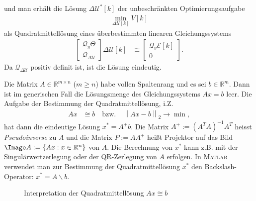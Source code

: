 und man erhält die Lösung $\Delta\mathcal{U}^{\ast}[k]$ der unbeschränkten Optimierungsaufgabe
\begin{align}
	\min\limits_{\Delta\mathcal{U}[k]}V[k]
\end{align}
als Quadratmittellösung eines überbestimmten linearen Gleichungssystems
\begin{align}
	\begin{bmatrix}
	\mathcal{Q}_y\Theta\\ \mathcal{Q}_{\Delta\mathcal{U}}
	\end{bmatrix}\Delta\mathcal{U}[k] & \cong \begin{bmatrix}
	\mathcal{Q}_y\mathcal{E}[k]\\ 0
	\end{bmatrix}. \label{eqn:kap_4_quadratmittelproblem}
\end{align}
Da $\mathcal{Q}_{\Delta\mathcal{U}}$ positiv definit ist, ist die Lösung eindeutig.
\begin{remark}
Die Matrix $A\in\mathbb{R}^{m\times n}$ ($m\ge n$) habe vollen Spaltenrang und es sei $b\in\mathbb{R}^m$. Dann ist im generischen Fall die
Lösungsmenge des Gleichungssystems $A x= b$ leer. Die Aufgabe der Bestimmung der Quadratmittellösung, i.Z.
\begin{align}
	A x & \cong b\quad \text{bzw.}\quad \left\| A x -b \right\|_2\rightarrow \min,
\end{align}
hat dann die eindeutige Lösung $x^{\ast}=A^+b$. Die Matrix $A^+:=\left(A^TA\right)^{-1}A^T$ heisst \textit{Pseudoinverse} zu $A$ und die Matrix $P:=A A^+$ heißt Projektor auf das Bild
$\Image A:=\left\{ A x : x\in\mathbb{R}^n \right\}$ von $A$. Die Berechnung von $x^{\ast}$ kann z.B. mit der Singulärwertzerlegung oder der
QR-Zerlegung von $A$ erfolgen. In \textsc{Matlab} verwendet man zur Bestimmung der Quadratmittellösung $x^{\ast}$ den Backslash-Operator: $x^{\ast}=A\backslash b$.
\end{remark} 
\begin{figure}[htb]
	\centering
	
	\caption{Interpretation der Quadratmittellösung $A x\cong b$}
	\label{fig:kap_4_interp_quadratmittelloesung}
\end{figure}
